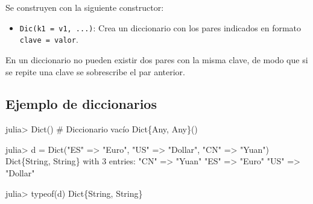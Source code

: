\documentclass[
  letterpaper,
  DIV=11,
  numbers=noendperiod]{scrreprt}
\newenvironment{Shaded}{\begin{snugshade}}{\end{snugshade}}
\newcommand{\CommentTok}[1]{\textcolor[rgb]{0.37,0.37,0.37}{#1}}
\newcommand{\DataTypeTok}[1]{\textcolor[rgb]{0.68,0.00,0.00}{#1}}
\newcommand{\FloatTok}[1]{\textcolor[rgb]{0.68,0.00,0.00}{#1}}
\newcommand{\FunctionTok}[1]{\textcolor[rgb]{0.28,0.35,0.67}{#1}}
\newcommand{\NormalTok}[1]{\textcolor[rgb]{0.00,0.23,0.31}{#1}}
\newcommand{\OperatorTok}[1]{\textcolor[rgb]{0.37,0.37,0.37}{#1}}
\newcommand{\StringTok}[1]{\textcolor[rgb]{0.13,0.47,0.30}{#1}}
\providecommand{\tightlist}{%
  \setlength{\itemsep}{0pt}\setlength{\parskip}{0pt}}\usepackage{longtable,booktabs,array}
\begin{document}
Se construyen con la siguiente constructor:

\begin{itemize}
\tightlist
\item
  \texttt{Dic(k1\ =\ v1,\ ...)}: Crea un diccionario con los pares
  indicados en formato \texttt{clave\ =\ valor}.
\end{itemize}

\begin{tcolorbox}[enhanced jigsaw, colbacktitle=quarto-callout-warning-color!10!white, coltitle=black, opacityback=0, opacitybacktitle=0.6, bottomtitle=1mm, leftrule=.75mm, toprule=.15mm, bottomrule=.15mm, toptitle=1mm, breakable, colframe=quarto-callout-warning-color-frame, colback=white, rightrule=.15mm, titlerule=0mm, title=\textcolor{quarto-callout-warning-color}{\faExclamationTriangle}\hspace{0.5em}{Warning}, arc=.35mm, left=2mm]
En un diccionario no pueden existir dos pares con la misma clave, de
modo que si se repite una clave se sobrescribe el par anterior.
\end{tcolorbox}

\hypertarget{ejemplo-de-diccionarios}{%
\subsection{Ejemplo de diccionarios}\label{ejemplo-de-diccionarios}}

\begin{Shaded}
\begin{Highlighting}[]
\NormalTok{julia}\OperatorTok{\textgreater{}} \FunctionTok{Dict}\NormalTok{()  }\CommentTok{\# Diccionario vacío}
\FunctionTok{Dict}\DataTypeTok{\{Any, Any\}}\NormalTok{()}

\NormalTok{julia}\OperatorTok{\textgreater{}}\NormalTok{ d }\OperatorTok{=} \FunctionTok{Dict}\NormalTok{(}\StringTok{"ES"} \OperatorTok{=\textgreater{}} \StringTok{"Euro"}\NormalTok{, }\StringTok{"US"} \OperatorTok{=\textgreater{}} \StringTok{"Dollar"}\NormalTok{, }\StringTok{"CN"} \OperatorTok{=\textgreater{}} \StringTok{"Yuan"}\NormalTok{)}
\DataTypeTok{Dict}\NormalTok{\{}\DataTypeTok{String}\NormalTok{, }\DataTypeTok{String}\NormalTok{\} with }\FloatTok{3}\NormalTok{ entries}\OperatorTok{:}
  \StringTok{"CN"} \OperatorTok{=\textgreater{}} \StringTok{"Yuan"}
  \StringTok{"ES"} \OperatorTok{=\textgreater{}} \StringTok{"Euro"}
  \StringTok{"US"} \OperatorTok{=\textgreater{}} \StringTok{"Dollar"}

\NormalTok{julia}\OperatorTok{\textgreater{}} \FunctionTok{typeof}\NormalTok{(d)}
\DataTypeTok{Dict}\NormalTok{\{}\DataTypeTok{String}\NormalTok{, }\DataTypeTok{String}\NormalTok{\}}
\end{Highlighting}
\end{Shaded}
\end{document}
